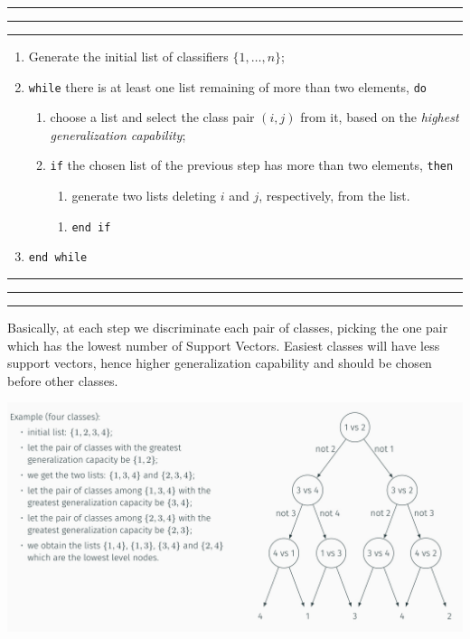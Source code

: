 \documentclass[10pt]{report}
\begin{document}
\vspace*{0.6cm}\hrule
\hrule
\hrule
\vspace*{0.4cm}
\begin{enumerate}
\item Generate the initial list of classifiers \(\{1,\dots,n\}\);
\item \texttt{while} there is at least one list remaining of more than two elements, \texttt{do}
\begin{enumerate}
\item choose a list and select the class pair \((i, j)\) from it, based on the \emph{highest generalization capability};
\item \texttt{if} the chosen list of the previous step has more than two elements, \texttt{then}
\begin{enumerate}
\item generate two lists deleting \(i\) and \(j\), respectively, from the list.
\end{enumerate}
\begin{enumerate}
\item \texttt{end if}
\end{enumerate}
\end{enumerate}
\item \texttt{end while}
\end{enumerate}
\vspace*{0.6cm}\hrule
\hrule
\hrule
\vspace*{0.4cm}

Basically, at each step we discriminate each pair of classes, picking the one
pair which has the lowest number of Support Vectors. Easiest classes will have
less support vectors, hence higher generalization capability and should be
chosen before other classes.

\begin{center}
\includegraphics[width=.9\linewidth]{./pics/svm/svm-pair-3.jpg}
\end{center}
\end{document}
